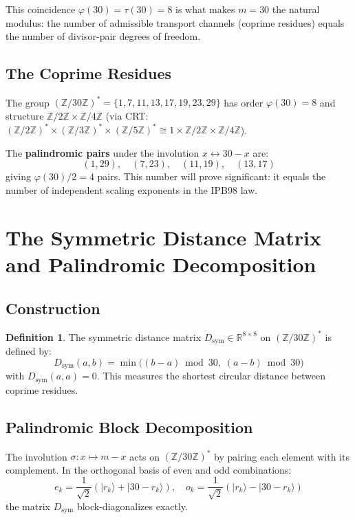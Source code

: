 \documentclass[11pt,letterpaper]{article}
\theoremstyle{definition}
\newtheorem{definition}[theorem]{Definition}
\begin{document}
This coincidence $\varphi(30) = \tau(30) = 8$ is what makes $m = 30$ the natural modulus: the number of admissible transport channels (coprime residues) equals the number of divisor-pair degrees of freedom.

\subsection{The Coprime Residues}

The group $(\mathbb{Z}/30\mathbb{Z})^* = \{1, 7, 11, 13, 17, 19, 23, 29\}$ has order $\varphi(30) = 8$ and structure $\mathbb{Z}/2\mathbb{Z} \times \mathbb{Z}/4\mathbb{Z}$ (via CRT: $(\mathbb{Z}/2\mathbb{Z})^* \times (\mathbb{Z}/3\mathbb{Z})^* \times (\mathbb{Z}/5\mathbb{Z})^* \cong 1 \times \mathbb{Z}/2\mathbb{Z} \times \mathbb{Z}/4\mathbb{Z}$).

The \textbf{palindromic pairs} under the involution $x \leftrightarrow 30 - x$ are:
\[
(1, 29), \quad (7, 23), \quad (11, 19), \quad (13, 17)
\]
giving $\varphi(30)/2 = 4$ pairs. This number will prove significant: it equals the number of independent scaling exponents in the IPB98 law.


\section{The Symmetric Distance Matrix and Palindromic Decomposition}

\subsection{Construction}

\begin{definition}
The symmetric distance matrix $D_{\text{sym}} \in \mathbb{R}^{8 \times 8}$ on $(\mathbb{Z}/30\mathbb{Z})^*$ is defined by:
\[
D_{\text{sym}}(a, b) = \min\bigl((b - a) \bmod 30, \; (a - b) \bmod 30\bigr)
\]
with $D_{\text{sym}}(a, a) = 0$. This measures the shortest circular distance between coprime residues.
\end{definition}

\subsection{Palindromic Block Decomposition}

The involution $\sigma\colon x \mapsto m - x$ acts on $(\mathbb{Z}/30\mathbb{Z})^*$ by pairing each element with its complement. In the orthogonal basis of even and odd combinations:
\[
e_k = \frac{1}{\sqrt{2}}(|r_k\rangle + |30 - r_k\rangle),
\quad
o_k = \frac{1}{\sqrt{2}}(|r_k\rangle - |30 - r_k\rangle)
\]
the matrix $D_{\text{sym}}$ block-diagonalizes exactly.
\end{document}

